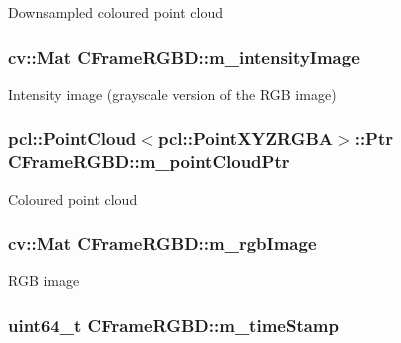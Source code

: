 \label{class_c_frame_r_g_b_d_aaff14ee9689f9d2d895300e5236be6d0}
Downsampled coloured point cloud \hypertarget{class_c_frame_r_g_b_d_a4267ae0f2e87e7f1b8faccce68ffecd3}{
\subsubsection[{m\_\-intensityImage}]{\setlength{\rightskip}{0pt plus 5cm}cv::Mat {\bf CFrameRGBD::m\_\-intensityImage}}}
\label{class_c_frame_r_g_b_d_a4267ae0f2e87e7f1b8faccce68ffecd3}
Intensity image (grayscale version of the RGB image) \hypertarget{class_c_frame_r_g_b_d_a72e3371759953f15c7bb6637bc6d8ab4}{
\subsubsection[{m\_\-pointCloudPtr}]{\setlength{\rightskip}{0pt plus 5cm}pcl::PointCloud$<$pcl::PointXYZRGBA$>$::Ptr {\bf CFrameRGBD::m\_\-pointCloudPtr}}}
\label{class_c_frame_r_g_b_d_a72e3371759953f15c7bb6637bc6d8ab4}
Coloured point cloud \hypertarget{class_c_frame_r_g_b_d_aaaa8d12b6df4db4a2a2e050d6894fa64}{
\subsubsection[{m\_\-rgbImage}]{\setlength{\rightskip}{0pt plus 5cm}cv::Mat {\bf CFrameRGBD::m\_\-rgbImage}}}
\label{class_c_frame_r_g_b_d_aaaa8d12b6df4db4a2a2e050d6894fa64}
RGB image \hypertarget{class_c_frame_r_g_b_d_a0f7c2fb4831a936c63b78305ab9298bd}{
\subsubsection[{m\_\-timeStamp}]{\setlength{\rightskip}{0pt plus 5cm}uint64\_\-t {\bf CFrameRGBD::m\_\-timeStamp}}}
